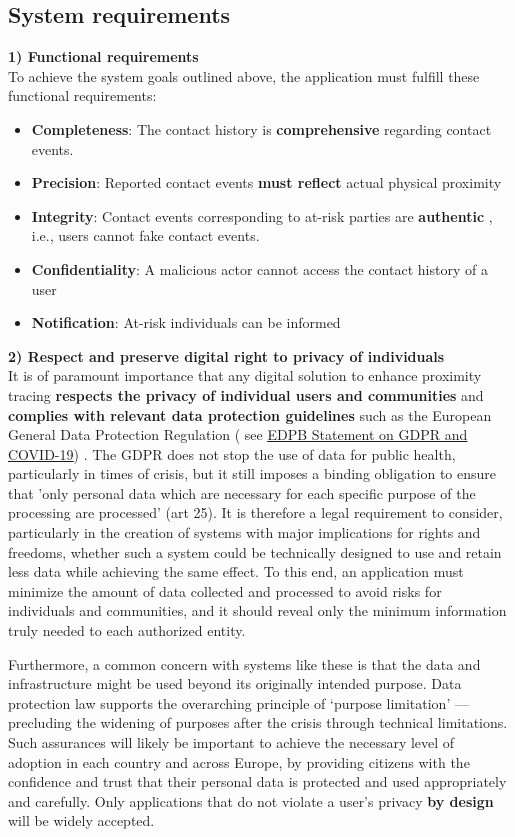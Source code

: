 \documentclass[12pt,a4paper]{article}
\begin{document}
\subsection*{System requirements}
\textbf{1) Functional requirements}\\
To achieve the system goals outlined above, the application must fulfill these functional
requirements:
\begin{itemize}\itemsep0pt
\item \textbf{Completeness}:  The contact history is \textbf{comprehensive}  regarding contact events.
\item \textbf{Precision}:  Reported contact events \textbf{must reflect}  actual physical proximity
\item \textbf{Integrity}: Contact events corresponding to at-risk parties are \textbf{authentic} , i.e., users cannot fake contact events.
\item \textbf{Confidentiality}:  A malicious actor cannot access the contact history of a user
\item \textbf{Notification}:  At-risk individuals can be informed
\end{itemize}
\textbf{2) Respect and preserve digital right to privacy of individuals}\\
It is of paramount importance that any digital solution to enhance proximity tracing \textbf{respects the privacy of individual users and communities} and \textbf{complies with relevant data protection guidelines} such as the European General Data Protection Regulation ( see \href{http://edpb.europa.eu}{\underline{EDPB Statement on GDPR and COVID-19}}) . The GDPR does not stop the use of data for public health, particularly in times of crisis, but it still imposes a binding obligation to ensure that 'only personal data which are necessary for each specific purpose of the processing are processed' (art 25). It is therefore a legal requirement to consider, particularly in the creation of systems with major implications for rights and freedoms, whether such a system could be technically designed to use and retain less data while achieving the same effect. To this end, an application must minimize the amount of data collected and processed to avoid risks for individuals and communities, and it should reveal only the minimum information truly needed to each authorized entity.

Furthermore, a common concern with systems like these is that the data and infrastructure
might be used beyond its originally intended purpose. Data protection law supports the
overarching principle of ‘purpose limitation’ — precluding the widening of purposes after the crisis through technical limitations. Such assurances will likely be important to achieve the necessary level of adoption in each country and across Europe, by providing citizens with the confidence and trust that their personal data is protected and used appropriately and carefully. Only applications that do not violate a user’s privacy \textbf{by design} will be widely accepted.
\end{document}

